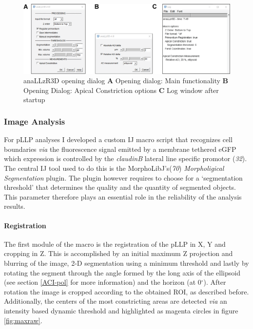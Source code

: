 \documentclass[11pt,singlespacinge,twoside]{reedthesis} %
\theoremstyle{definition}
\theoremstyle{definition}
\theoremstyle{definition}
\theoremstyle{remark}
\begin{document}
\begin{figure}[H]

{\centering \includegraphics[width=0.95\linewidth]{figures/materials/macros/anallzr3D_macro} 

}

\caption[anaLLzR3D opening dialog]{anaLLzR3D opening dialog \textbf{A} Opening dialog: Main functionality \textbf{B} Opening Dialog: Apical Constriction options \textbf{C} Log window after startup}\label{fig:anallzr3ddialog}
\end{figure}
\hypertarget{image-analysis-1}{%
\subsubsection{Image Analysis}\label{image-analysis-1}}

For pLLP analyses I developed a custom IJ macro script that recognizes cell boundaries \emph{via} the fluorescence signal emitted by a membrane tethered eGFP which expression is controlled by the \emph{claudinB} lateral line specific promotor (\emph{32}). The central IJ tool used to do this is the MorphoLibJ's(\emph{70}) \emph{Morpholigical Segmentation} plugin. The plugin however requires to choose for a `segmentation threshold' that determines the quality and the quantity of segmented objects. This parameter therefore plays an essential role in the reliability of the analysis results.

\hypertarget{registration-1}{%
\paragraph{Registration}\label{registration-1}}

The first module of the macro is the registration of the pLLP in X, Y and cropping in Z. This is accomplished by an initial maximum Z projection and blurring of the image, 2-D segmentation using a minimum threshold and lastly by rotating the segment through the angle formed by the long axis of the ellipsoid (see section \ref{ACI-pol} for more information) and the horizon (at 0\(^{\circ}\)). After rotation the image is cropped according to the obtained ROI, as described before. Additionally, the centers of the most constricting areas are detected \emph{via} an intensity based dynamic threshold and highlighted as magenta circles in figure \ref{fig:maxraw}.
\end{document}
